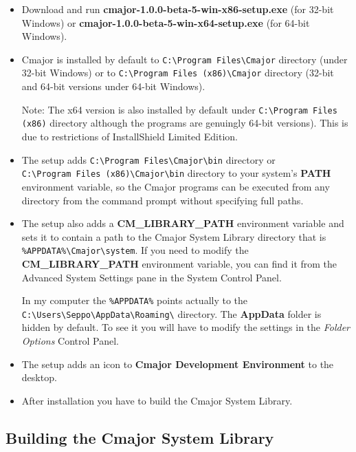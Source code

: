 \documentclass[oneside, a4paper, 11pt]{article}
\begin{document}
\begin{itemize}

\item
Download and run \textbf{cmajor-1.0.0-beta-5-win-x86-setup.exe} (for 32-bit Windows) or
\textbf{cmajor-1.0.0-beta-5-win-x64-setup.exe} (for 64-bit Windows).

\item
Cmajor is installed by default to \verb|C:\Program Files\Cmajor| directory (under 32-bit Windows) or
to \verb|C:\Program Files (x86)\Cmajor| directory (32-bit and 64-bit versions under 64-bit Windows).

Note: The x64 version is also installed by default under
\verb|C:\Program Files (x86)| directory although the programs are genuingly 64-bit versions).
This is due to restrictions of InstallShield Limited Edition.

\item
The setup adds \verb|C:\Program Files\Cmajor\bin| directory or \\
\verb|C:\Program Files (x86)\Cmajor\bin| directory
to your system's \textbf{PATH} environment variable, so the Cmajor programs can be executed from any
directory from the command prompt without specifying full paths.

\item
The setup also adds a \textbf{CM\_LIBRARY\_PATH} environment variable and
sets it to contain a path to the Cmajor System Library directory
that is \verb|%APPDATA%\Cmajor\system|. If you need to modify the
\textbf{CM\_LIBRARY\_PATH} environment variable, you can find it from the Advanced System Settings pane in the System Control Panel.

In my computer the \verb|%APPDATA%| points actually to the
\verb|C:\Users\Seppo\AppData\Roaming\| directory. The \textbf{AppData} folder
is hidden by default. To see it you will have to modify the settings in
the \emph{Folder Options} Control Panel.

\item
The setup adds an icon to \textbf{Cmajor Development Environment} to the desktop.

\item
After installation you have to build the Cmajor System Library.


\end{itemize}

\subsection{Building the Cmajor System Library}
\end{document}

